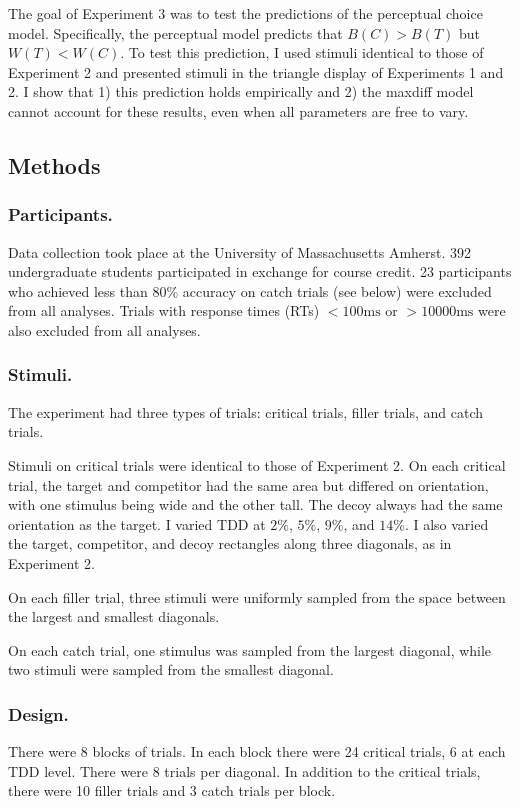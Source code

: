 The goal of Experiment 3 was to test the predictions of the perceptual choice model. Specifically, the perceptual model predicts that $B(C)>B(T)$ but $W(T)<W(C)$. To test this prediction, I used stimuli identical to those of Experiment 2 and presented stimuli in the triangle display of Experiments 1 and 2.
I show that 1) this prediction holds empirically and 2) the maxdiff model cannot account for these results, even when all parameters are free to vary. 

\subsection{Methods}

\subsubsection{Participants.}
Data collection took place at the University of Massachusetts Amherst. 392 undergraduate students participated in exchange for course credit. 23 participants who achieved less than $80\%$ accuracy on catch trials (see below) were excluded from all analyses. Trials with response times (RTs) $<100\text{ms}$ or  $>10000\text{ms}$ were also excluded from all analyses.

\subsubsection{Stimuli.}
The experiment had three types of trials: critical trials, filler trials, and catch trials. 

Stimuli on critical trials were identical to those of Experiment 2. On each critical trial, the target and competitor had the same area but differed on orientation, with one stimulus being wide and the other tall. The decoy always had the same orientation as the target. I varied TDD at $2\%$, $5\%$, $9\%$, and $14\%$. I also varied the target, competitor, and decoy rectangles along three diagonals, as in Experiment 2. 

On each filler trial, three stimuli were uniformly sampled from the space between the largest and smallest diagonals.

On each catch trial, one stimulus was sampled from the largest diagonal, while two stimuli were sampled from the smallest diagonal.

\subsubsection{Design.}
There were 8 blocks of trials. In each block there were 24 critical trials, 6 at each TDD level. There were 8 trials per diagonal. In addition to the critical trials, there were 10 filler trials and 3 catch trials per block.

